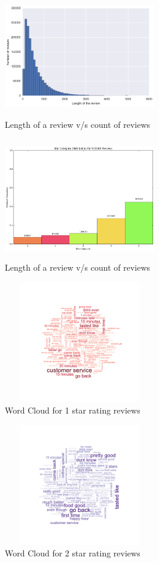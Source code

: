 \documentclass[paper=a4, fontsize=11pt]{scrartcl} %
\numberwithin{equation}{section} %
\numberwithin{figure}{section} %
\numberwithin{table}{section} %
\begin{document}
\begin{figure}[!htb]
\centering
\includegraphics[width=250px, height = 200px]{len_count.png}
\caption{Length of a review v/s count of reviews}
\label{length_count}
\end{figure} 

\begin{figure}[!htb]
\centering
\includegraphics[width=250px, height = 200px]{star_review_count.png}
\caption{Length of a review v/s count of reviews}
\label{star_distribution}
\end{figure} 

\begin{figure}[!htb]
\centering
\includegraphics[width=250px, height = 200px]{1_star_wordcloud_500k.png}
\caption{Word Cloud for 1 star rating reviews}
\label{wc1}
\end{figure} 

\begin{figure}[!htb]
\centering
\includegraphics[width=250px, height = 200px]{2_star_wordcloud_500k.png}
\caption{Word Cloud for 2 star rating reviews}
\label{wc2}
\end{figure} 
\end{document}
